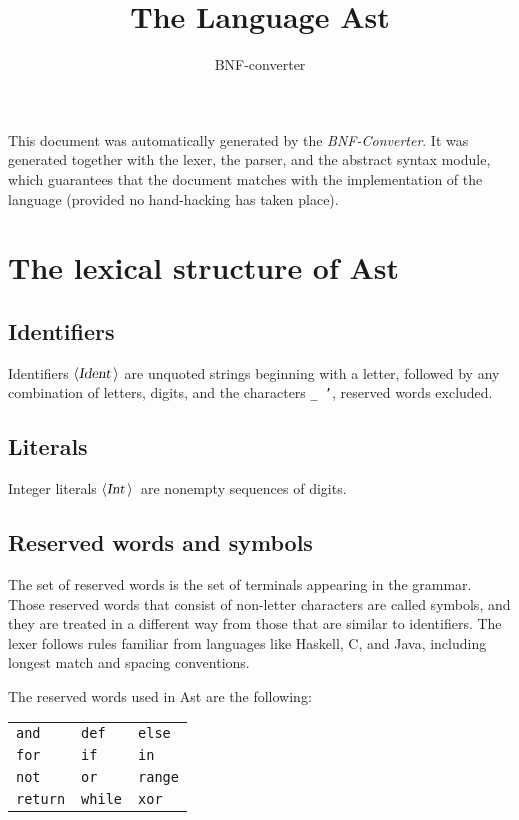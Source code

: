 \documentclass[a4paper,11pt]{article}
\title{The Language Ast}
\author{BNF-converter}
\begin{document}
\maketitle


\newcommand{\emptyP}{\mbox{$\epsilon$}}
\newcommand{\terminal}[1]{\mbox{{\texttt {#1}}}}
\newcommand{\nonterminal}[1]{\mbox{$\langle \mbox{{\sl #1 }} \! \rangle$}}
\newcommand{\arrow}{\mbox{::=}}
\newcommand{\delimit}{\mbox{$|$}}
\newcommand{\reserved}[1]{\mbox{{\texttt {#1}}}}
\newcommand{\literal}[1]{\mbox{{\texttt {#1}}}}
\newcommand{\symb}[1]{\mbox{{\texttt {#1}}}}

This document was automatically generated by the {\em BNF-Converter}.
It was generated together with the lexer, the parser, and the
abstract syntax module, which guarantees that the document
matches with the implementation of the language
(provided no hand-hacking has taken place).

\section*{The lexical structure of Ast}

\subsection*{Identifiers}
Identifiers \nonterminal{Ident} are unquoted strings beginning with a letter,
followed by any combination of letters, digits, and the characters {\tt \_ '},
reserved words excluded.
\subsection*{Literals}
Integer literals \nonterminal{Int}\ are nonempty sequences of digits.

\subsection*{Reserved words and symbols}
The set of reserved words is the set of terminals appearing in the grammar. Those reserved words that consist of non-letter characters are called symbols, and they are treated in a different way from those that are similar to identifiers. The lexer follows rules familiar from languages like Haskell, C, and Java, including longest match and spacing conventions.

The reserved words used in Ast are the following: \\

\begin{tabular}{lll}
{\reserved{and}} &{\reserved{def}} &{\reserved{else}} \\
{\reserved{for}} &{\reserved{if}} &{\reserved{in}} \\
{\reserved{not}} &{\reserved{or}} &{\reserved{range}} \\
{\reserved{return}} &{\reserved{while}} &{\reserved{xor}} \\
\end{tabular}\\
\end{document}
